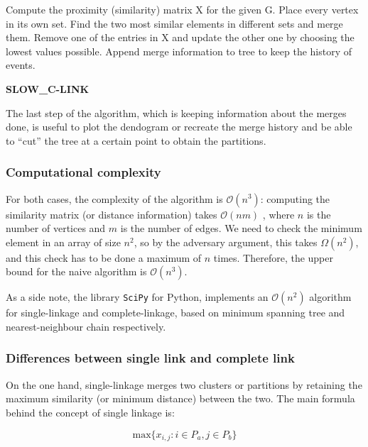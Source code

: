 \documentclass[12pt,a4paper]{article}
\begin{document}
\begin{algorithm}[h]
  \SetAlgoLined

  \nl Compute the proximity (similarity) matrix X for the given G.\;
  \nl Place every vertex in its own set.\;
  \nl Find the two most similar elements in different sets and merge them.\;
  \nl Remove one of the entries in X and update the other one by choosing the lowest
  values possible.\;
  \nl Append merge information to tree to keep the history of events.\;
  \nl {}
  \caption{\bf SLOW\_C-LINK}
  \label{clink}
\end{algorithm}

The last step of the algorithm, which is keeping information about
the merges done, is useful to plot the dendogram or recreate the
merge history and be able to ``cut'' the tree at a certain point to
obtain the partitions.

\subsubsection{Computational complexity}

For both cases, the complexity of the algorithm is
$\mathcal{O}(n^3)$: computing the similarity matrix (or distance
information) takes $\mathcal{O}(nm)$ \cite{newman}, where $n$ is the
number of vertices and $m$ is the number of edges. We need to check
the minimum element in an array of size $n^2$, so by the adversary
argument, this takes $\Omega (n^2)$, and this check has to be
done a maximum of $n$ times. Therefore, the upper bound for the
naive algorithm is $\mathcal{O}(n^3)$.

As a side note, the library \texttt{SciPy} for Python, implements an
$\mathcal{O}(n^2)$ algorithm for single-linkage and
complete-linkage, based on minimum spanning tree and
nearest-neighbour chain respectively.

\subsubsection{Differences between single link and complete link}

On the one hand, single-linkage merges two clusters or partitions by
retaining the maximum similarity (or minimum distance) between the
two. The main formula behind the concept of single linkage is:

$$ \mathrm{max}\{x_{i,j} : i \in P_a, j \in P_b\} $$
\end{document}
